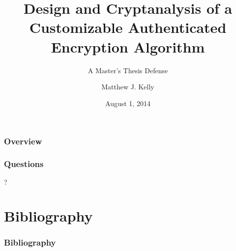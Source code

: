 \documentclass[11pt,american]{beamer}
\title[Customizable AE Algorithm]
{Design and Cryptanalysis of a Customizable Authenticated Encryption Algorithm}
\subtitle{A Master's Thesis Defense}
\author{Matthew J. Kelly} %
\institute[RIT] {
Rochester Institute of Technology \\ %
\medskip
\emph{mjk7841@rit.edu} %
\vspace{1em}

Supervised by \\
\smallskip
Alan Kaminsky, \emph{Primary Advisor} \\
Marcin {\L}ukowiak, \emph{Primary Advisor} \\
Michael Kurdziel, \emph{Advisor} \\
Reza Azarderakhsh, \emph{Advisor} \\
\smallskip
Stanis{\l}aw Radziszowski, \emph{Team Member} \\
\medskip
\large
August 1, 2014
}
\date{August 1, 2014}
\begin{document}
\begin{frame}
  \titlepage
\end{frame}

\begin{frame}
  \frametitle{Overview}
  \tableofcontents[hideallsubsections]
\end{frame}








\begin{frame}
\frametitle{Questions}
\begin{center}
\Huge ?
\end{center}
\end{frame}

\section*{Bibliography}
\begin{frame}[allowframebreaks]
\frametitle{Bibliography}
\tiny


\end{frame}
\end{document}
